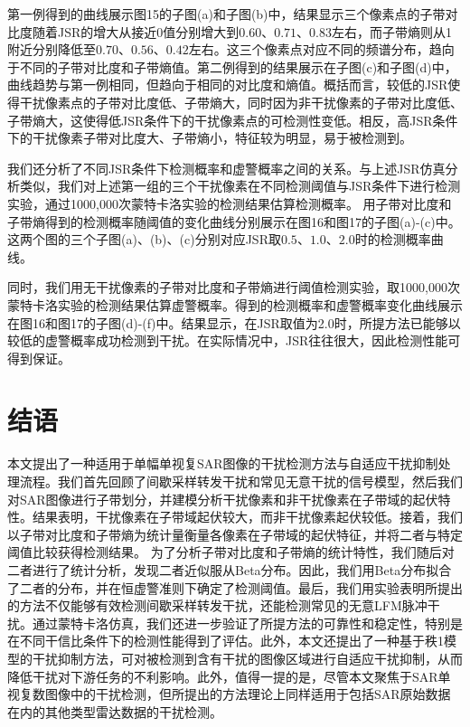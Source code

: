 \documentclass[10.5pt,UTF8]{JR}
\theoremstyle{mystyle}
\begin{document}
第一例得到的曲线展示图15的子图(a)和子图(b)中，结果显示三个像素点的子带对比度随着JSR的增大从接近0值分别增大到$0.60$、$0.71$、$0.83$左右，而子带熵则从1附近分别降低至$0.70$、$0.56$、$0.42$左右。这三个像素点对应不同的频谱分布，趋向于不同的子带对比度和子带熵值。第二例得到的结果展示在子图(c)和子图(d)中，曲线趋势与第一例相同，但趋向于相同的对比度和熵值。概括而言，较低的JSR使得干扰像素点的子带对比度低、子带熵大，同时因为非干扰像素的子带对比度低、子带熵大，这使得低JSR条件下的干扰像素点的可检测性变低。相反，高JSR条件下的干扰像素子带对比度大、子带熵小，特征较为明显，易于被检测到。

我们还分析了不同JSR条件下检测概率和虚警概率之间的关系。与上述JSR仿真分析类似，我们对上述第一组的三个干扰像素在不同检测阈值与JSR条件下进行检测实验，通过1000,000次蒙特卡洛实验的检测结果估算检测概率。
用子带对比度和子带熵得到的检测概率随阈值的变化曲线分别展示在图16和图17的子图(a)-(c)中。这两个图的三个子图(a)、(b)、(c)分别对应JSR取$0.5$、$1.0$、$2.0$时的检测概率曲线。

同时，我们用无干扰像素的子带对比度和子带熵进行阈值检测实验，取1000,000次蒙特卡洛实验的检测结果估算虚警概率。得到的检测概率和虚警概率变化曲线展示在图16和图17的子图(d)-(f)中。结果显示，在JSR取值为2.0时，所提方法已能够以较低的虚警概率成功检测到干扰。在实际情况中，JSR往往很大，因此检测性能可得到保证。



\section{结语}
 
本文提出了一种适用于单幅单视复SAR图像的干扰检测方法与自适应干扰抑制处理流程。我们首先回顾了间歇采样转发干扰和常见无意干扰的信号模型，然后我们对SAR图像进行子带划分，并建模分析干扰像素和非干扰像素在子带域的起伏特性。结果表明，干扰像素在子带域起伏较大，而非干扰像素起伏较低。接着，我们以子带对比度和子带熵为统计量衡量各像素在子带域的起伏特征，并将二者与特定阈值比较获得检测结果。
为了分析子带对比度和子带熵的统计特性，我们随后对二者进行了统计分析，发现二者近似服从Beta分布。因此，我们用Beta分布拟合了二者的分布，并在恒虚警准则下确定了检测阈值。最后，我们用实验表明所提出的方法不仅能够有效检测间歇采样转发干扰，还能检测常见的无意LFM脉冲干扰。通过蒙特卡洛仿真，我们还进一步验证了所提方法的可靠性和稳定性，特别是在不同干信比条件下的检测性能得到了评估。此外，本文还提出了一种基于秩1模型的干扰抑制方法，可对被检测到含有干扰的图像区域进行自适应干扰抑制，从而降低干扰对下游任务的不利影响。此外，值得一提的是，尽管本文聚焦于SAR单视复数图像中的干扰检测，但所提出的方法理论上同样适用于包括SAR原始数据在内的其他类型雷达数据的干扰检测。
\end{document}
